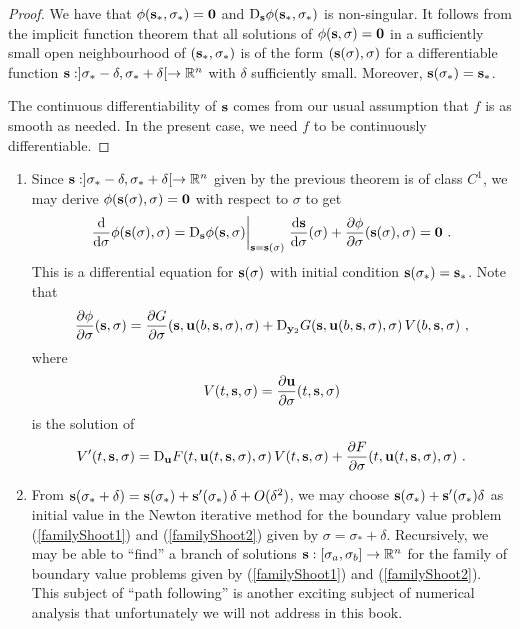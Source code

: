 \begin{proof}
We have that $\phi(\mathbf{s}_\ast,\sigma_\ast) = \mathbf{0}$ and
$\mathrm{D}_{\mathbf{s}}\phi(\mathbf{s}_\ast,\sigma_\ast)$ is non-singular.
It follows from the implicit function theorem that all solutions
of $\phi(\mathbf{s},\sigma) = \mathbf{0}$ in a sufficiently small
open neighbourhood of $(\mathbf{s}_\ast,\sigma_\ast)$ is of the form
$(\mathbf{s}(\sigma),\sigma)$ for a differentiable function
$\mathbf{s} : ]\sigma_\ast-\delta,\sigma_\ast+\delta[ \to \mathbb{R}^n$ with
$\delta$ sufficiently small.  Moreover,
$\mathbf{s}(\sigma_\ast) = \mathbf{s}_\ast$.

The continuous differentiability of $\mathbf{s}$ comes from our usual
assumption that $f$ is as smooth as needed.  In the present case, we
need $f$ to be continuously differentiable.
\end{proof}

\begin{rmkList}
\begin{enumerate}
\item Since $\mathbf{s}:]\sigma_\ast -\delta,\sigma_\ast + \delta[ \to \mathbb{R}^n$
given by the previous theorem is of class $C^1$, we may derive
$\phi(\mathbf{s}(\sigma), \sigma) = \mathbf{0}$ with respect to $\sigma$
to get
\[
\frac{\mathrm{d}}{\mathrm{d}{\sigma}}{\phi(\mathbf{s}(\sigma), \sigma)}
= \mathrm{D}_{\mathbf{s}}\phi(\mathbf{s},\sigma)\bigg|_{\mathbf{s} = \mathbf{s}(\sigma)}\;
\frac{\mathrm{d}\mathbf{s}}{\mathrm{d}{\sigma}}(\sigma)
+ \frac{\partial{\phi}}{\partial{\sigma}}(\mathbf{s}(\sigma),\sigma) = \mathbf{0} \ .
\]
This is a differential equation for $\mathbf{s}(\sigma)$ with initial
condition $\mathbf{s}(\sigma_\ast) = \mathbf{s}_\ast$.
Note that
\[
\frac{\partial{\phi}}{\partial{\sigma}}(\mathbf{s},\sigma)
= \frac{\partial{G}}{\partial{\sigma}}(\mathbf{s},\mathbf{u}(b,\mathbf{s},\sigma),\sigma) +
\mathrm{D}_{\mathbf{y}_2}G(\mathbf{s},\mathbf{u}(b,\mathbf{s},\sigma),\sigma)
\,V(b,\mathbf{s},\sigma) \ ,
\]
where
\[
V(t,\mathbf{s},\sigma) = 
\frac{\partial{\mathbf{u}}}{\partial{\sigma}}(t,\mathbf{s},\sigma)
\]
is the solution of
\[
V'(t,\VEC{s},\sigma) =
\diff_{\VEC{u}} F(t,\VEC{u}(t,\VEC{s},\sigma),\sigma)
\,V(t,\VEC{s},\sigma) +
\pdydx{F}{\sigma}(t,\VEC{u}(t,\VEC{s},\sigma),\sigma) \ .
\]
\item From $\mathbf{s}(\sigma_\ast+\delta) = \mathbf{s}(\sigma_\ast) +
\mathbf{s}'(\sigma_\ast)\, \delta + O(\delta^2)$, we may choose
$\mathbf{s}(\sigma_\ast) + \mathbf{s}'(\sigma_\ast)\delta$ as initial value
in the Newton iterative method for the boundary value problem
(\ref{familyShoot1}) and (\ref{familyShoot2}) given by
$\sigma = \sigma_\ast + \delta$.  Recursively, we may be able to
``find'' a branch of solutions $\mathbf{s}:[\sigma_a,\sigma_b]\to \mathbb{R}^n$
for the family of boundary value problems given by
(\ref{familyShoot1}) and (\ref{familyShoot2}).  This subject of
``path following'' is another exciting subject of numerical analysis
that unfortunately we will not address in this book.
\end{enumerate}
\end{rmkList}

